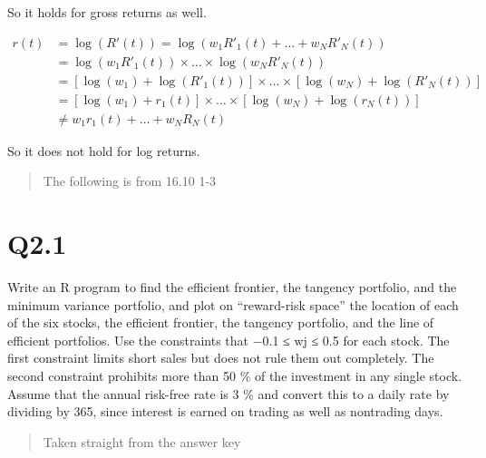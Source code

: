 \documentclass[
  oneside]{book}
\newenvironment{Shaded}{\begin{snugshade}}{\end{snugshade}}
\newcommand{\AttributeTok}[1]{\textcolor[rgb]{0.77,0.63,0.00}{#1}}
\newcommand{\DecValTok}[1]{\textcolor[rgb]{0.00,0.00,0.81}{#1}}
\newcommand{\FunctionTok}[1]{\textcolor[rgb]{0.00,0.00,0.00}{#1}}
\newcommand{\NormalTok}[1]{#1}
\newcommand{\OtherTok}[1]{\textcolor[rgb]{0.56,0.35,0.01}{#1}}
\newcommand{\SpecialCharTok}[1]{\textcolor[rgb]{0.00,0.00,0.00}{#1}}
\newcommand{\StringTok}[1]{\textcolor[rgb]{0.31,0.60,0.02}{#1}}
\begin{document}
So it holds for gross returns as well.

\[
\begin{aligned}
r(t) &= \log(R'(t)) = \log(w_{1}R'_{1}(t) + \dots + w_{N}R'_{N}(t))\\
&= \log(w_{1}R'_{1}(t)) \times \dots \times \log(w_{N}R'_{N}(t))\\
&= [\log(w_{1}) + \log(R'_{1}(t))] \times \dots \times [\log(w_{N}) + \log(R'_{N}(t))]\\
&= [\log(w_{1}) + r_{1}(t)] \times \dots \times [\log(w_{N}) + \log(r_{N}(t))]\\
&\ne w_{1}r_{1}(t) + \dots + w_{N}R_{N}(t)
\end{aligned}
\]

So it does not hold for log returns.

\begin{quote}
The following is from 16.10 1-3
\end{quote}

\hypertarget{q2.1}{%
\section{Q2.1}\label{q2.1}}

Write an R program to find the efficient frontier, the tangency portfolio, and the minimum variance portfolio, and plot on ``reward-risk space'' the location of each of the six stocks, the efficient frontier, the tangency portfolio, and the line of efficient portfolios. Use the constraints that −0.1 ≤ wj ≤ 0.5 for each stock. The first constraint limits short sales but does not rule them out completely. The second constraint prohibits more than 50 \% of the investment in any single stock. Assume that the annual risk-free rate is 3 \% and convert this to a daily rate by dividing by 365, since interest is earned on trading as well as nontrading days.

\begin{quote}
Taken straight from the answer key
\end{quote}

\begin{Shaded}
\end{Shaded}
\end{document}

